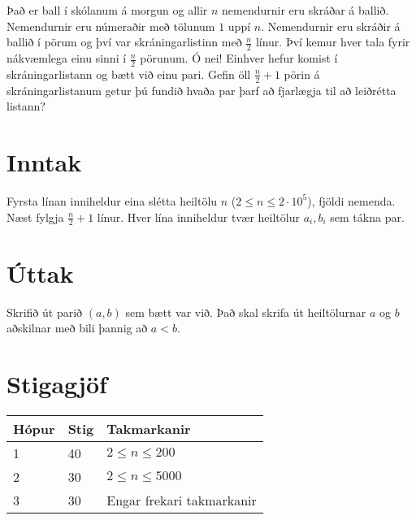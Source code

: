 
Það er ball í skólanum á morgun og allir $n$ nemendurnir eru skráðar á ballið.
Nemendurnir eru númeraðir með tölunum $1$ uppí $n$.
Nemendurnir eru skráðir á ballið í pörum og því var skráningarlistinn með $\frac{n}{2}$ línur.
Því kemur hver tala fyrir nákvæmlega einu sinni í $\frac{n}{2}$ pörunum.
Ó nei! Einhver hefur komist í skráningarlistann og bætt við einu pari.
Gefin öll $\frac{n}{2} + 1$ pörin á skráningarlistanum getur þú fundið hvaða par þarf að fjarlægja til að leiðrétta listann?

\section*{Inntak}
Fyrsta línan inniheldur eina slétta heiltölu $n$ ($2 \leq n \leq
2 \cdot 10^5$), fjöldi nemenda.
Næst fylgja $\frac{n}{2} + 1$ línur.
Hver lína inniheldur tvær heiltölur $a_i, b_i$ sem tákna par.

\section*{Úttak}
Skrifið út parið $(a, b)$ sem bætt var við. Það skal skrifa út heiltölurnar $a$ og $b$ aðskilnar með bili þannig að $a < b$.

\section*{Stigagjöf}
\begin{tabular}{|l|l|l|}
\hline
Hópur & Stig & Takmarkanir \\ \hline
1     & 40   & $2 \leq n \leq 200$ \\ \hline
2     & 30   & $2 \leq n \leq 5000$ \\ \hline
3     & 30   & Engar frekari takmarkanir\\ \hline
\end{tabular}

